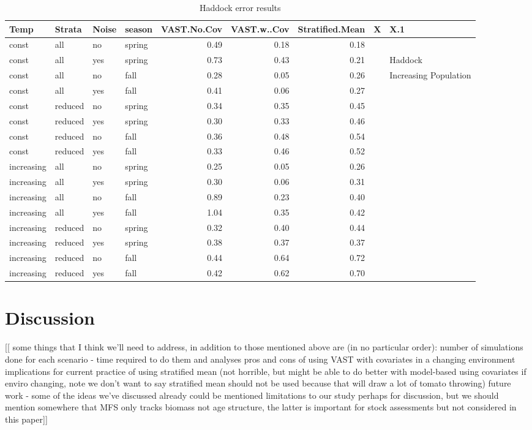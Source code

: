 \documentclass[
  12pt,
]{article}
\begin{document}
\begin{table}

\caption{\label{tab:unnamed-chunk-1}Haddock error results}
\centering
\begin{tabular}[t]{l|l|l|l|r|r|r|l|l}
\hline
Temp & Strata & Noise & season & VAST.No.Cov & VAST.w..Cov & Stratified.Mean & X & X.1\\
\hline
const & all & no & spring & 0.49 & 0.18 & 0.18 &  & \\
\hline
const & all & yes & spring & 0.73 & 0.43 & 0.21 &  & Haddock\\
\hline
const & all & no & fall & 0.28 & 0.05 & 0.26 &  & Increasing Population\\
\hline
const & all & yes & fall & 0.41 & 0.06 & 0.27 &  & \\
\hline
const & reduced & no & spring & 0.34 & 0.35 & 0.45 &  & \\
\hline
const & reduced & yes & spring & 0.30 & 0.33 & 0.46 &  & \\
\hline
const & reduced & no & fall & 0.36 & 0.48 & 0.54 &  & \\
\hline
const & reduced & yes & fall & 0.33 & 0.46 & 0.52 &  & \\
\hline
increasing & all & no & spring & 0.25 & 0.05 & 0.26 &  & \\
\hline
increasing & all & yes & spring & 0.30 & 0.06 & 0.31 &  & \\
\hline
increasing & all & no & fall & 0.89 & 0.23 & 0.40 &  & \\
\hline
increasing & all & yes & fall & 1.04 & 0.35 & 0.42 &  & \\
\hline
increasing & reduced & no & spring & 0.32 & 0.40 & 0.44 &  & \\
\hline
increasing & reduced & yes & spring & 0.38 & 0.37 & 0.37 &  & \\
\hline
increasing & reduced & no & fall & 0.44 & 0.64 & 0.72 &  & \\
\hline
increasing & reduced & yes & fall & 0.42 & 0.62 & 0.70 &  & \\
\hline
\end{tabular}
\end{table}

\section{Discussion}

{[}{[} some things that I think we'll need to address, in addition to those mentioned above are (in no particular order):
number of simulations done for each scenario - time required to do them and analyses
pros and cons of using VAST with covariates in a changing environment
implications for current practice of using stratified mean (not horrible, but might be able to do better with model-based using covariates if enviro changing, note we don't want to say stratified mean should not be used because that will draw a lot of tomato throwing)
future work - some of the ideas we've discussed already could be mentioned
limitations to our study
perhaps for discussion, but we should mention somewhere that MFS only tracks biomass not age structure, the latter is important for stock assessments but not considered in this paper{]}{]}
\end{document}
